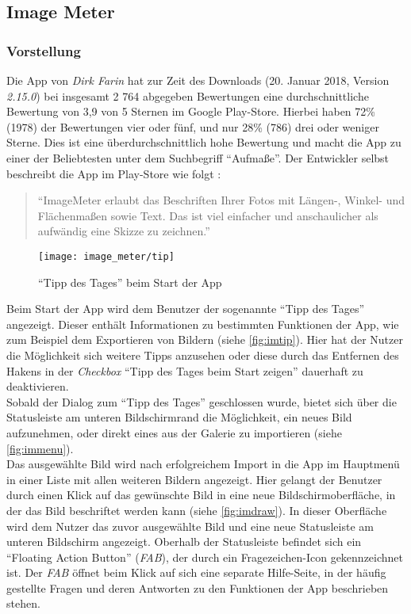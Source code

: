 \subsection{Image Meter}
\subsubsection{Vorstellung}
Die App \im{} von \emph{Dirk Farin} hat zur Zeit des Downloads (20. Januar 2018, Version \emph{2.15.0}) bei insgesamt 2 764 abgegeben Bewertungen eine durchschnittliche Bewertung von 3,9 von 5 Sternen im Google Play-Store.
Hierbei haben 72\% (1978) der Bewertungen vier oder fünf, und nur 28\% (786) drei oder weniger Sterne.
Dies ist eine überdurchschnittlich hohe Bewertung und macht die App zu einer der Beliebtesten unter dem Suchbegriff ``Aufmaße''.
Der Entwickler selbst beschreibt die App im Play-Store wie folgt \citep{FarinIM}:

\begin{quote}
  ``ImageMeter erlaubt das Beschriften Ihrer Fotos mit Längen-, Winkel- und Flächenmaßen sowie Text.
  Das ist viel einfacher und anschaulicher als aufwändig eine Skizze zu zeichnen.''
\end{quote}

\noindent
\begin{wrapfigure}{R}{0.4\textwidth}
  \centering
  \texttt{[image: image\_meter/tip]}
  \caption{``Tipp des Tages'' beim Start der App}
  \label{fig:imtip}
\end{wrapfigure}
Beim Start der App wird dem Benutzer der sogenannte ``Tipp des Tages'' angezeigt.
Dieser enthält Informationen zu bestimmten Funktionen der App, wie zum Beispiel dem Exportieren von Bildern (siehe \autoref{fig:imtip}).
Hier hat der Nutzer die Möglichkeit sich weitere Tipps anzusehen oder diese durch das Entfernen des Hakens in der \emph{Checkbox} ``Tipp des Tages beim Start zeigen'' dauerhaft zu deaktivieren. \\

Sobald der Dialog zum ``Tipp des Tages'' geschlossen wurde, bietet sich über die Statusleiste am unteren Bildschirmrand die Möglichkeit, ein neues Bild aufzunehmen, oder direkt eines aus der Galerie zu importieren (siehe \autoref{fig:immenu}). \\

Das ausgewählte Bild wird nach erfolgreichem Import in die App im Hauptmenü in einer Liste mit allen weiteren Bildern angezeigt.
Hier gelangt der Benutzer durch einen Klick auf das gewünschte Bild in eine neue Bildschirmoberfläche, in der das Bild beschriftet werden kann (siehe \autoref{fig:imdraw}).
In dieser Oberfläche wird dem Nutzer das zuvor ausgewählte Bild und eine neue Statusleiste am unteren Bildschirm angezeigt.
Oberhalb der Statusleiste befindet sich ein ``Floating Action Button'' (\emph{FAB}), der durch ein Fragezeichen-Icon gekennzeichnet ist.
Der \emph{FAB} öffnet beim Klick auf sich eine separate Hilfe-Seite, in der häufig gestellte Fragen und deren Antworten zu den Funktionen der App beschrieben stehen. \\

